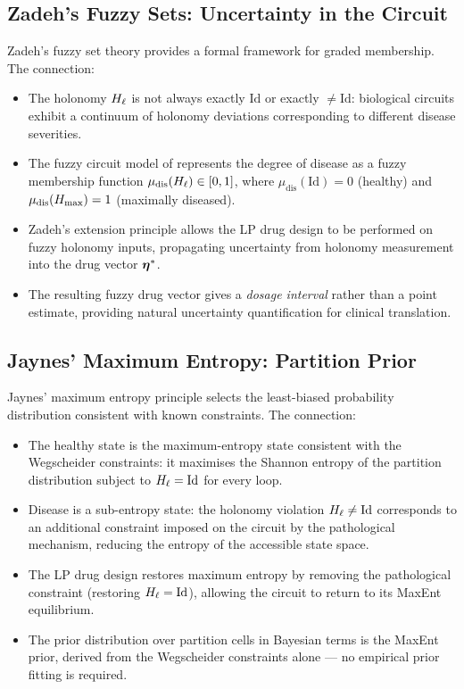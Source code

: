 \subsection{Zadeh's Fuzzy Sets: Uncertainty in the Circuit}

Zadeh's fuzzy set theory \citep{Zadeh1965} provides a formal framework for
graded membership.  The connection:

\begin{itemize}[leftmargin=2em]
  \item The holonomy $H_\ell$ is not always exactly $\mathrm{Id}$ or exactly
    $\neq \mathrm{Id}$: biological circuits exhibit a continuum of holonomy
    deviations corresponding to different disease severities.
  \item The fuzzy circuit model of  represents the
    degree of disease as a fuzzy membership function $\mu_{\mathrm{dis}}(H_\ell)
    \in [0, 1]$, where $\mu_{\mathrm{dis}}(\mathrm{Id}) = 0$ (healthy) and
    $\mu_{\mathrm{dis}}(H_{\max}) = 1$ (maximally diseased).
  \item Zadeh's extension principle \citep{Zadeh1978} allows the LP drug
    design to be performed on fuzzy holonomy inputs, propagating uncertainty
    from holonomy measurement into the drug vector $\boldsymbol{\eta}^*$.
  \item The resulting fuzzy drug vector gives a \emph{dosage interval} rather
    than a point estimate, providing natural uncertainty quantification for
    clinical translation.
\end{itemize}

\subsection{Jaynes' Maximum Entropy: Partition Prior}

Jaynes' maximum entropy principle \citep{Jaynes1957} selects the least-biased
probability distribution consistent with known constraints.  The connection:

\begin{itemize}[leftmargin=2em]
  \item The healthy state is the maximum-entropy state consistent with the
    Wegscheider constraints: it maximises the Shannon entropy of the partition
    distribution subject to $H_\ell = \mathrm{Id}$ for every loop.
  \item Disease is a sub-entropy state: the holonomy violation $H_\ell \neq
    \mathrm{Id}$ corresponds to an additional constraint imposed on the
    circuit by the pathological mechanism, reducing the entropy of the
    accessible state space.
  \item The LP drug design restores maximum entropy by removing the pathological
    constraint (restoring $H_\ell = \mathrm{Id}$), allowing the circuit to
    return to its MaxEnt equilibrium.
  \item The prior distribution over partition cells in Bayesian terms is the
    MaxEnt prior, derived from the Wegscheider constraints alone — no
    empirical prior fitting is required.
\end{itemize}

